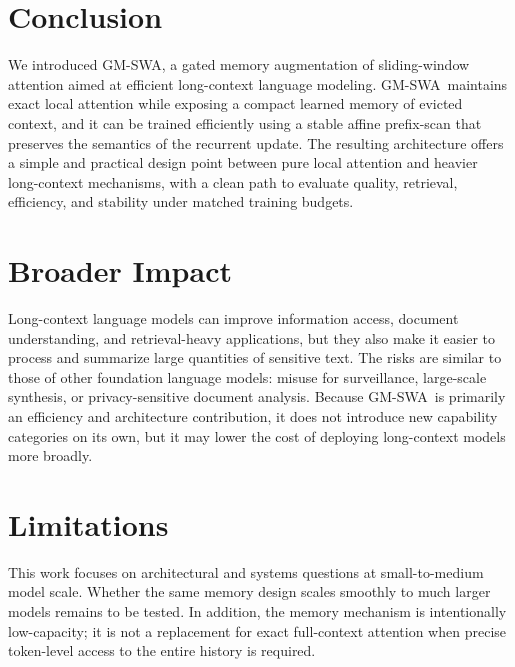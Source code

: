 \documentclass{article}
\newcommand{\model}{GM-SWA}
\begin{document}
\section{Conclusion}

We introduced \model, a gated memory augmentation of sliding-window attention aimed at efficient long-context language modeling. \model\ maintains exact local attention while exposing a compact learned memory of evicted context, and it can be trained efficiently using a stable affine prefix-scan that preserves the semantics of the recurrent update. The resulting architecture offers a simple and practical design point between pure local attention and heavier long-context mechanisms, with a clean path to evaluate quality, retrieval, efficiency, and stability under matched training budgets.

\section*{Broader Impact}

Long-context language models can improve information access, document understanding, and retrieval-heavy applications, but they also make it easier to process and summarize large quantities of sensitive text. The risks are similar to those of other foundation language models: misuse for surveillance, large-scale synthesis, or privacy-sensitive document analysis. Because \model\ is primarily an efficiency and architecture contribution, it does not introduce new capability categories on its own, but it may lower the cost of deploying long-context models more broadly.

\section*{Limitations}

This work focuses on architectural and systems questions at small-to-medium model scale. Whether the same memory design scales smoothly to much larger models remains to be tested. In addition, the memory mechanism is intentionally low-capacity; it is not a replacement for exact full-context attention when precise token-level access to the entire history is required.
\end{document}
